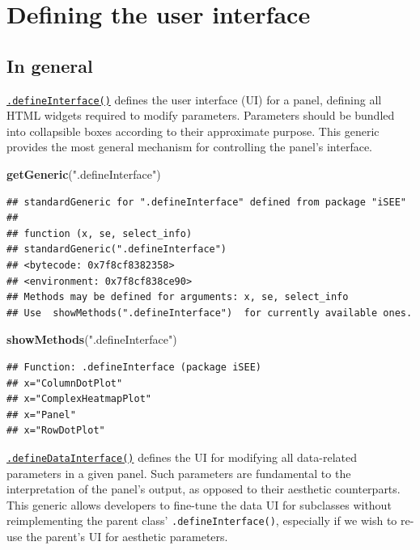 \documentclass[
]{book}
\newenvironment{Shaded}{\begin{snugshade}}{\end{snugshade}}
\newcommand{\KeywordTok}[1]{\textcolor[rgb]{0.13,0.29,0.53}{\textbf{#1}}}
\newcommand{\NormalTok}[1]{#1}
\newcommand{\StringTok}[1]{\textcolor[rgb]{0.31,0.60,0.02}{#1}}
\begin{document}
\hypertarget{defining-the-user-interface}{%
\section{Defining the user interface}\label{defining-the-user-interface}}

\hypertarget{in-general}{%
\subsection{In general}\label{in-general}}

\href{https://isee.github.io/iSEE/reference/interface-generics.html}{\texttt{.defineInterface()}} defines the user interface (UI) for a panel, defining all HTML widgets required to modify parameters.
Parameters should be bundled into collapsible boxes according to their approximate purpose.
This generic provides the most general mechanism for controlling the panel's interface.

\begin{Shaded}
\begin{Highlighting}[]
\KeywordTok{getGeneric}\NormalTok{(}\StringTok{".defineInterface"}\NormalTok{)}
\end{Highlighting}
\end{Shaded}

\begin{verbatim}
## standardGeneric for ".defineInterface" defined from package "iSEE"
## 
## function (x, se, select_info) 
## standardGeneric(".defineInterface")
## <bytecode: 0x7f8cf8382358>
## <environment: 0x7f8cf838ce90>
## Methods may be defined for arguments: x, se, select_info
## Use  showMethods(".defineInterface")  for currently available ones.
\end{verbatim}

\begin{Shaded}
\begin{Highlighting}[]
\KeywordTok{showMethods}\NormalTok{(}\StringTok{".defineInterface"}\NormalTok{)}
\end{Highlighting}
\end{Shaded}

\begin{verbatim}
## Function: .defineInterface (package iSEE)
## x="ColumnDotPlot"
## x="ComplexHeatmapPlot"
## x="Panel"
## x="RowDotPlot"
\end{verbatim}

\href{https://isee.github.io/iSEE/reference/interface-generics.html}{\texttt{.defineDataInterface()}} defines the UI for modifying all data-related parameters in a given panel.
Such parameters are fundamental to the interpretation of the panel's output, as opposed to their aesthetic counterparts.
This generic allows developers to fine-tune the data UI for subclasses without reimplementing the parent class' \texttt{.defineInterface()}, especially if we wish to re-use the parent's UI for aesthetic parameters.
\end{document}
